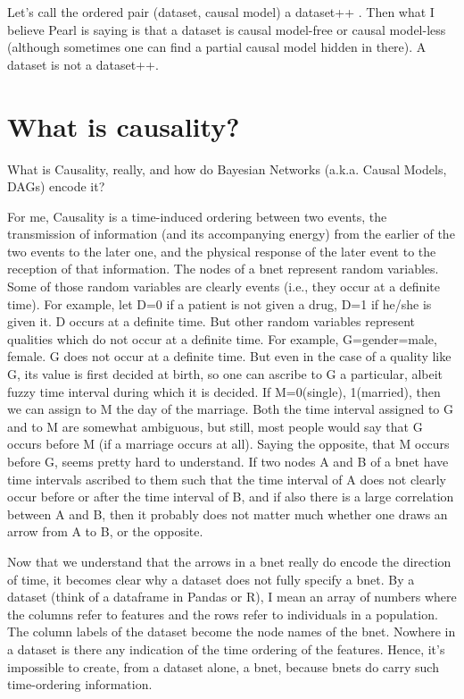 Let’s call the ordered pair
(dataset, causal model) a
dataset++ . Then what I
believe Pearl is saying is that a
dataset is causal model-free or causal model-less
(although sometimes one can find a partial
causal model hidden in there). A dataset
is not a dataset++.

\section{What is causality?}
What is Causality, really, and how do Bayesian Networks
(a.k.a. Causal Models,
DAGs) encode it?

For me, Causality is a time-induced ordering between two events, the
transmission of information (and its accompanying
energy) from the earlier of the two events to the later
one, and the physical response of the later event to the reception of that
information. The nodes of a bnet represent random variables. Some of those
random variables are clearly events (i.e., they occur at a definite time).
For example, let D=0 if a patient is not given a drug, D=1 if he/she is given
it. D occurs at a definite time. But other random variables represent
qualities which do not occur at a definite time. For example,
G=gender=male, female. G does not occur at a definite time.  But even in the
case of a quality like G, its value is first decided at birth, so one can
ascribe to G a particular, albeit fuzzy time interval during which it is
decided. If M=0(single), 1(married), then we can assign to M the day of the
marriage. Both the time interval assigned to G and to  M are somewhat
ambiguous, but still, most people would say that G occurs before M (if a
marriage occurs at all). Saying the opposite, that M occurs before G, seems
pretty hard to understand. If two nodes A and B of a bnet have time intervals
ascribed to them such that the time interval of A does not clearly occur
before or after the time interval of B, and if also there is a large
correlation between A and B, then it probably does not matter
much whether one draws an arrow from A to B, or the opposite.

Now that we understand that the arrows in a bnet really do encode the
direction of time, it becomes clear why a dataset does not fully specify a
bnet. By a dataset (think of a dataframe in Pandas or R), I mean an array of
numbers where the columns refer to features and the rows refer to individuals
in a population. The column labels of the dataset become the node names of
the bnet. Nowhere in a dataset is there any indication of the time ordering
of the features. Hence, it’s impossible to create, from a dataset alone, a
bnet, because bnets do carry such time-ordering information.

